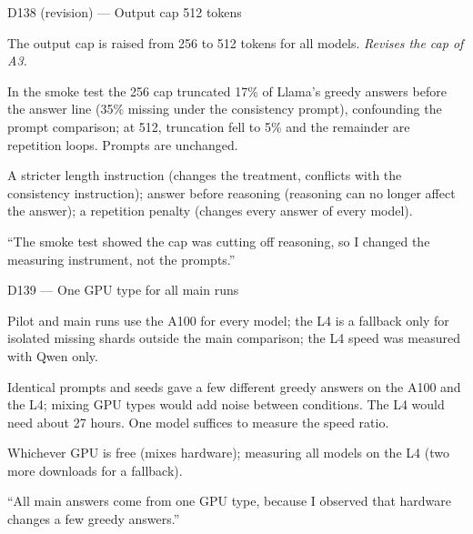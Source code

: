 \documentclass[11pt,a4paper]{report}
\begin{document}
\begin{decisionbox}{D138 (revision) --- Output cap 512 tokens}
\begin{description}[nosep, leftmargin=0pt]
  \item[Decision.] The output cap is raised from 256 to 512 tokens for all models. \emph{Revises the cap of A3.}
  \item[Why.] In the smoke test the 256 cap truncated 17\% of Llama's greedy answers before the answer line (35\% missing under the consistency prompt), confounding the prompt comparison; at 512, truncation fell to 5\% and the remainder are repetition loops. Prompts are unchanged.
  \item[Alternatives.] A stricter length instruction (changes the treatment, conflicts with the consistency instruction); answer before reasoning (reasoning can no longer affect the answer); a repetition penalty (changes every answer of every model).
  \item[Interview line.] ``The smoke test showed the cap was cutting off reasoning, so I changed the measuring instrument, not the prompts.''
\end{description}
\end{decisionbox}

\begin{decisionbox}{D139 --- One GPU type for all main runs}
\begin{description}[nosep, leftmargin=0pt]
  \item[Decision.] Pilot and main runs use the A100 for every model; the L4 is a fallback only for isolated missing shards outside the main comparison; the L4 speed was measured with Qwen only.
  \item[Why.] Identical prompts and seeds gave a few different greedy answers on the A100 and the L4; mixing GPU types would add noise between conditions. The L4 would need about 27 hours. One model suffices to measure the speed ratio.
  \item[Alternatives.] Whichever GPU is free (mixes hardware); measuring all models on the L4 (two more downloads for a fallback).
  \item[Interview line.] ``All main answers come from one GPU type, because I observed that hardware changes a few greedy answers.''
\end{description}
\end{decisionbox}
\end{document}
